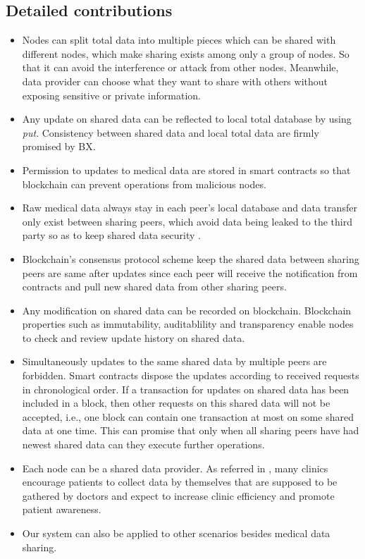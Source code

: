 \documentclass[conference]{IEEEtran}
\begin{document}
\subsection{Detailed contributions}
\begin{itemize}
	\item Nodes can split total data into multiple pieces which can be shared with different nodes, which make sharing exists among only a group of nodes. So that it can avoid the interference or attack from other nodes. Meanwhile, data provider can choose what they want to share with others without exposing sensitive or private information.
	
	\item Any update on shared data can be reflected to local total database by using \emph{put}. Consistency between shared data and local total data are firmly promised by BX. 
	
	\item Permission to updates to medical data are stored in smart contracts so that blockchain can prevent operations from malicious nodes. 
	
	\item Raw medical data always stay in each peer's local database and data transfer only exist between sharing peers, which avoid data being leaked to the third party so as to keep shared data security .
	
	\item Blockchain's  consensus protocol scheme keep the shared data between sharing peers are same after updates since each peer will receive the notification from contracts and pull new shared data from other sharing peers.

	\item Any modification on shared data can be recorded on blockchain. Blockchain properties such as immutability, auditablility and transparency enable nodes to check and review update history on shared data.
	
	\item Simultaneously updates to the same shared data by multiple peers are forbidden. Smart contracts dispose the updates according to received requests in chronological order. If a transaction for updates on shared data has been included in a block, then other requests on this shared data will not be accepted, i.e., one block can contain one transaction at most on some shared data at one time. This can promise that only when all sharing peers have had newest shared data can they execute further operations.
	
	\item Each node can be a shared data provider. As referred in \cite{chung2018using},  many clinics encourage patients to collect data by themselves that are supposed to be gathered by doctors and expect to increase clinic efficiency and promote patient awareness.
	
	\item Our system can also be applied to other scenarios besides medical data sharing.
	
\end{itemize}
\end{document}
